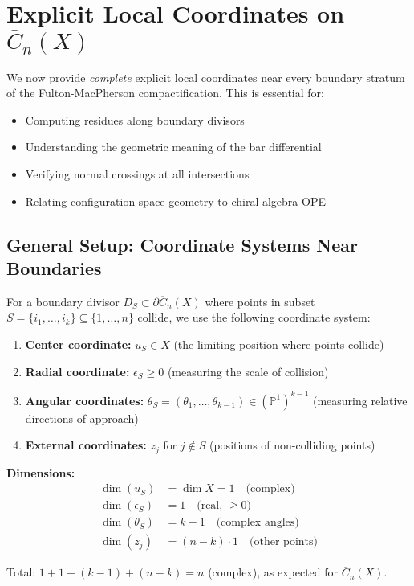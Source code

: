 \section{Explicit Local Coordinates on $\overline{C}_n(X)$}
\label{sec:explicit-coordinates-complete}

We now provide \emph{complete} explicit local coordinates near every boundary stratum
of the Fulton-MacPherson compactification. This is essential for:
\begin{itemize}
\item Computing residues along boundary divisors
\item Understanding the geometric meaning of the bar differential
\item Verifying normal crossings at all intersections  
\item Relating configuration space geometry to chiral algebra OPE
\end{itemize}

\subsection{General Setup: Coordinate Systems Near Boundaries}

\begin{convention}\label{conv:coordinate-notation}
For a boundary divisor $D_S \subset \partial\overline{C}_n(X)$ where points in subset
$S = \{i_1, \ldots, i_k\} \subseteq \{1,\ldots,n\}$ collide, we use the following
coordinate system:

\begin{enumerate}
\item \textbf{Center coordinate:} $u_S \in X$ (the limiting position where points collide)

\item \textbf{Radial coordinate:} $\epsilon_S \geq 0$ (measuring the scale of collision)

\item \textbf{Angular coordinates:} $\theta_S = (\theta_1, \ldots, \theta_{k-1}) \in 
(\mathbb{P}^1)^{k-1}$ (measuring relative directions of approach)

\item \textbf{External coordinates:} $z_j$ for $j \notin S$ (positions of non-colliding points)
\end{enumerate}

\textbf{Dimensions:}
\begin{align*}
\dim(u_S) &= \dim X = 1 \quad \text{(complex)}\\
\dim(\epsilon_S) &= 1 \quad \text{(real, } \geq 0)\\
\dim(\theta_S) &= k-1 \quad \text{(complex angles)}\\
\dim(z_j) &= (n-k) \cdot 1 \quad \text{(other points)}
\end{align*}

Total: $1 + 1 + (k-1) + (n-k) = n$ (complex), as expected for $\overline{C}_n(X)$.
\end{convention}

